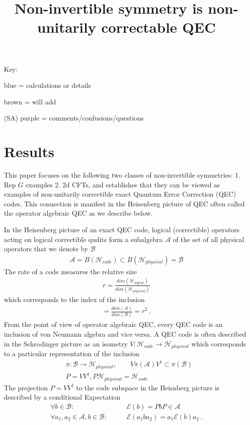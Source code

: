 \documentclass{article}
\title{Non-invertible symmetry is non-unitarily correctable QEC}
\author{ }
\date{}
\newcommand{\mA}{\mathcal{A}}
\newcommand{\mB}{\mathcal{B}}
\newcommand{\mH}{\mathcal{H}}
\newcommand{\mE}{\mathcal{E}}
\newcommand{\nn}{\nonumber}
\theoremstyle{definition}
\newcommand{\SA}[1]{{\color{sulaiman}\footnotesize{(SA) #1}}}
\begin{document}
  \maketitle
  Key:

  \color{blue}
  blue
  \color{black}
  = calculations or details

  \color{brown}
  brown
  \color{black}
  = will add

  \SA{purple} = comments/confusions/questions

  \section{Results}

  This paper focuses on the following two classes of non-invertible symmetries: 1.
  Rep $G$ examples 2. 2d CFTs, and establishes that they can be viewed as
  examples of non-unitarily correctible exact Quantum Error Correction (QEC)
  codes. This connection is manifest in the Heisenberg picture of QEC often called
  the operator algebraic QEC as we describe below.

  In the Heisenberg picture of an exact QEC code, logical (correctible)
  operators acting on logical correctible qudits form a subalgebra $\mA$ of the
  set of all physical operators that we denote by $\mathcal{B}$
  \begin{align}
    \mathcal{A}=B(\mH_{code})\subset B(\mH_{physical})=\mathcal{B}
  \end{align}
  The rate of a code measures the relative size
  \begin{align}
    r=\frac{dim(\mH_{logical})}{dim(\mH_{physical})}
  \end{align}
  which corresponds to the index of the inclusion
  \begin{align}
    [B:A]=\frac{dim(\mA)}{dim(\mB)}=r^{2}\ .
  \end{align}
  From the point of view of operator algebraic QEC, every QEC code is an inclusion
  of von Neumann algebra and vice versa. A QEC code is often described in the
  Schrodinger picture as an isometry $V:\mH_{code}\to \mH_{physical}$ which
  corresponds to a particular representation of the inclusion
  \begin{align}
     & \pi:\mB\to \mH_{physical},\qquad V\pi(\mA)V^{\dagger}\subset \pi(\mB)\nn \\
     & P=VV^{\dagger}, P\mH_{physical}=\mH_{code}
  \end{align}
  The projection $P=VV^{\dagger}$ to the code subspace in the Heisnberg picture
  is described by a conditional Expectation
  \begin{align}
    \forall b\in \mB:\qquad                     & \mathcal{E}(b) =P b P\in \mA\nn       \\
    \forall a_{1},a_{2}\in \mA, b\in \mB:\qquad & \mE(a_{1}b a_{2})=a_{1}\mE(b)a_{2}\ .
  \end{align}
\end{document}
